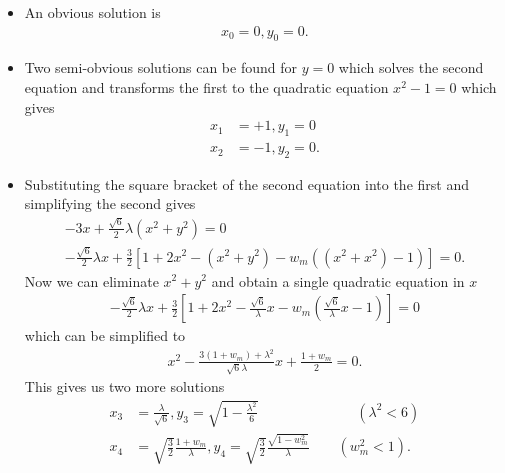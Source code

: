 \documentclass[10pt,a4paper]{book}
\theoremstyle{definition}
\begin{document}
\begin{itemize}
\item An obvious solution is 
\begin{align}
    x_0=0, y_0=0.
\end{align}
\item Two semi-obvious solutions can be found for $y=0$ which solves the second equation and transforms the first to the quadratic equation $x^2-1=0$ which gives
\begin{align}
    x_1&=+1, y_1=0\\
    x_2&=-1, y_2=0.
\end{align}
\item Substituting the square bracket of the second equation into the first and simplifying the second gives
\begin{align}
    -3x+\frac{\sqrt{6}}{2}\lambda (x^2+y^2)=0\\
    -\frac{\sqrt{6}}{2}\lambda x+\frac{3}{2}[1+2x^2-(x^2+y^2)-w_m((x^2+x^2)-1)]=0.
\end{align}
Now we can eliminate $x^2+y^2$ and obtain a single quadratic equation in $x$
\begin{align}
    -\frac{\sqrt{6}}{2}\lambda x+\frac{3}{2}\left[1+2x^2-\frac{\sqrt{6}}{\lambda}x-w_m\left(\frac{\sqrt{6}}{\lambda}x-1\right)\right]=0
\end{align}
which can be simplified to
\begin{align}
    x^2-\frac{3(1+w_m)+\lambda^2}{\sqrt{6}\lambda}x+\frac{1+w_m}{2}=0.
\end{align}
This gives us two more solutions
\begin{align}
    x_3&=\frac{\lambda}{\sqrt{6}}, y_3=\sqrt{1-\frac{\lambda^2}{6}}\qquad\qquad\qquad\quad(\lambda^2<6)\\
    x_4&=\sqrt{\frac{3}{2}}\frac{1+w_m}{\lambda}, y_4=\sqrt{\frac{3}{2}}\frac{\sqrt{1-w_m^2}}{\lambda}\qquad(w_m^2<1).
\end{align}


\end{itemize}
\end{document}
